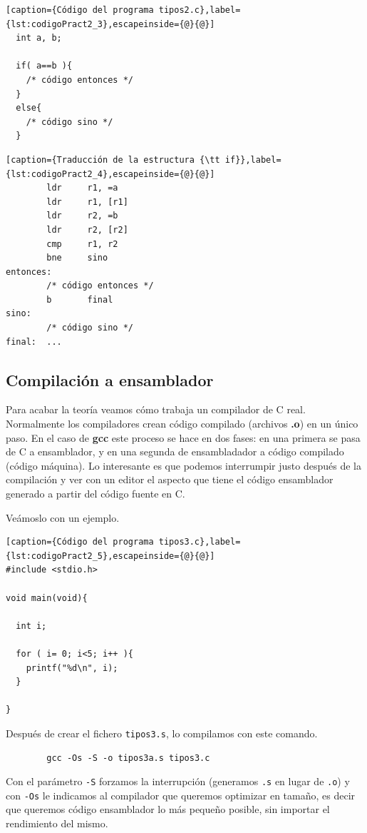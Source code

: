 \begin{lstlisting}[caption={Código del programa tipos2.c},label={lst:codigoPract2_3},escapeinside={@}{@}]
  int a, b;

  if( a==b ){ 
    /* código entonces */
  }
  else{
    /* código sino */
  }
\end{lstlisting}

\begin{lstlisting}[caption={Traducción de la estructura {\tt if}},label={lst:codigoPract2_4},escapeinside={@}{@}]
        ldr     r1, =a
        ldr     r1, [r1]
        ldr     r2, =b
        ldr     r2, [r2]
        cmp     r1, r2
        bne     sino
entonces:
        /* código entonces */
        b       final
sino:
        /* código sino */
final:  ...
\end{lstlisting}

\subsection{Compilación a ensamblador}

Para acabar la teoría veamos cómo trabaja un compilador de C real. Normalmente
los compiladores crean código compilado (archivos {\bf .o}) en un
único paso. En el caso de {\bf gcc} este proceso se hace en dos fases: en una
primera se pasa de C a ensamblador, y en una segunda de ensambladador a código
compilado (código máquina). Lo interesante es que podemos interrumpir justo
después de la compilación y ver con un editor el aspecto que tiene el código
ensamblador generado a partir del código fuente en C.

Veámoslo con un ejemplo.

\begin{lstlisting}[caption={Código del programa tipos3.c},label={lst:codigoPract2_5},escapeinside={@}{@}]
#include <stdio.h>

void main(void){

  int i;

  for ( i= 0; i<5; i++ ){
    printf("%d\n", i);
  }

}
\end{lstlisting}

Después de crear el fichero {\tt tipos3.s}, lo compilamos con este comando.

\begin{lstlisting}
        gcc -Os -S -o tipos3a.s tipos3.c
\end{lstlisting}

Con el parámetro {\tt -S} forzamos la interrupción (generamos {\tt .s} en lugar de
{\tt .o}) y con {\tt -Os} le indicamos al compilador que queremos optimizar en
tamaño, es decir que queremos código ensamblador lo más pequeño posible, sin
importar el rendimiento del mismo.

